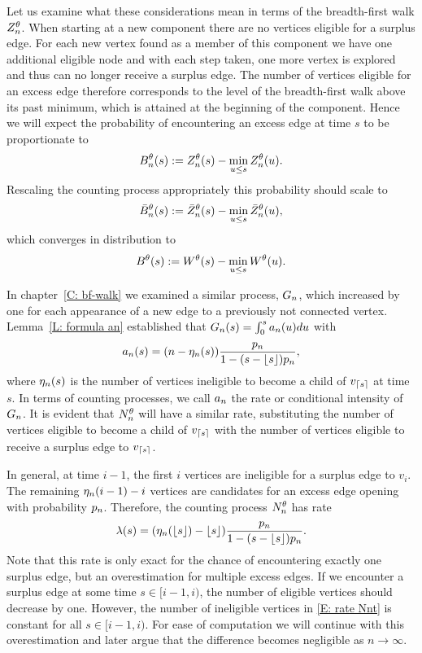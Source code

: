 Let us examine what these considerations mean in terms of the breadth-first walk $Z_n^{\theta}$.
When starting at a new component there are no vertices eligible for a surplus edge.
For each new vertex found as a member of this component we have one additional eligible node 
and with each step taken, one more vertex is explored and thus can no longer receive a surplus edge.
The number of vertices eligible for an excess edge therefore corresponds to the level of the breadth-first walk above its past minimum,
which is attained at the beginning of the component.
Hence we will expect the probability of encountering an excess edge at time $s$ to be proportionate to
\begin{equation} \label{D: zminz}
B_n^{\theta}(s) := Z_n^{\theta}(s) - \min_{u \leq s}Z_n^{\theta}(u).
\end{equation}
Rescaling the counting process appropriately this probability should scale to
\begin{equation}
\bar{B}_n^{\theta}(s) := \bar{Z}^{\theta}_n(s) - \min_{u \leq s}\bar{Z}^{\theta}_n(u),
\end{equation}
which converges in distribution to
\begin{equation}
B^{\theta}(s) := W^{\theta}(s) - \min_{u \leq s}W^{\theta}(u). 
\end{equation}

In chapter~\ref{C: bf-walk} we examined a similar process, $G_n$, 
which increased by one for each appearance of a new edge to a previously not connected vertex.
Lemma~\ref{L: formula an} established that $G_n(s) = \int_{0}^{s} a_n(u)du$ with
\begin{equation*}
	a_n(s) = (n - \eta_n(s)) \frac{p_n}{1-(s-\lfloor s\rfloor)p_n},
\end{equation*}
where $\eta_n(s)$ is the number of vertices ineligible to become a child of $v_{\lceil s\rceil}$ at time $s$.
In terms of counting processes, we call $a_n$ the rate or conditional intensity of $G_n$.
It is evident that $N_n^{\theta}$ will have a similar rate,
substituting the number of vertices eligible to become a child of $v_{\lceil s\rceil}$ with the number of vertices eligible to receive a surplus edge to $v_{\lceil s\rceil}$.

In general, at time $i-1$, the first $i$ vertices are ineligible for a surplus edge to $v_i$.
The remaining $\eta_n(i-1) - i$ vertices are candidates for an excess edge opening with probability $p_n$.
Therefore, the counting process $N_n^{\theta}$ has rate
\begin{equation} \label{E: rate Nnt}
\lambda(s) = (\eta_n(\lfloor s\rfloor) - \lfloor s\rfloor) \frac{p_n}{1-(s-\lfloor s\rfloor)p_n}.
\end{equation}
Note that this rate is only exact for the chance of encountering exactly one surplus edge, 
but an overestimation for multiple excess edges.
If we encounter a surplus edge at some time $s \in [i-1, i)$,
the number of eligible vertices should decrease by one.
However, the number of ineligible vertices in \eqref{E: rate Nnt} is constant for all $s \in [i-1, i)$.
For ease of computation we will continue with this overestimation and later argue that the difference becomes negligible as $n \rightarrow \infty$.

